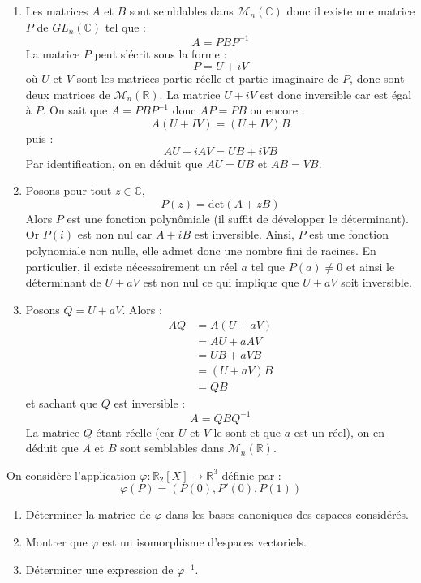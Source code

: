 \documentclass[a4paper,10pt]{report}
\begin{document}
\corr \begin{enumerate}
\item Les matrices $A$ et $B$ sont semblables dans $\mathcal{M}_n(\mathbb{C})$ donc il existe une matrice $P$ de $GL_n(\mathbb{C})$ tel que :
$$ A=PBP^{-1}$$
La matrice $P$ peut s'écrit sous la forme :
$$ P = U+i V$$
où $U$ et $V$ sont les matrices \og partie réelle \fg et \og partie imaginaire \fg de $P$, donc sont deux matrices de $\mathcal{M}_n(\mathbb{R})$. La matrice $U+iV$ est donc inversible car est égal à $P$. On sait que $A=PBP^{-1}$ donc $AP=PB$ ou encore :
$$ A(U+IV) = (U+IV)B$$
puis :
$$ AU+ i AV = UB + i VB$$
Par identification, on en déduit que $AU=UB$ et $AB=VB$.
\item Posons pour tout $z \in \mathbb{C}$,
$$ P(z) = \textrm{det}(A+zB)$$
Alors $P$ est une fonction polynômiale (il suffit de développer le déterminant). Or $P(i)$ est non nul car $A+iB$ est inversible. Ainsi, $P$ est une fonction polynomiale non nulle, elle admet donc une nombre fini de racines. En particulier, il existe nécessairement un réel $a$ tel que $P(a) \neq 0$ et ainsi le déterminant de $U+aV$ est non nul ce qui implique que $U+aV$ soit inversible.
\item Posons $Q=U+aV$. Alors :
\begin{align*}
AQ & = A(U+aV) \\
& = AU + a AV \\
& = UB + a VB \\
& = (U+aV)B \\
& = QB
\end{align*}
et sachant que $Q$ est inversible :
$$ A= QBQ^{-1}$$
La matrice $Q$ étant réelle (car $U$ et $V$ le sont et que $a$ est un réel), on en déduit que $A$ et $B$ sont semblables dans $\mathcal{M}_n(\mathbb{R})$.
\end{enumerate}

\begin{Exa} On considère l'application $\varphi : \mathbb{R}_2[X] \rightarrow \mathbb{R}^3$ définie par :
\[ \varphi(P)=(P(0),P'(0),P(1)) \]

\begin{enumerate}
\item Déterminer la matrice de $\varphi$ dans les bases canoniques des espaces considérés.
\item Montrer que $\varphi$ est un isomorphisme d'espaces vectoriels.
\item Déterminer une expression de $\varphi^{-1}$.
\end{enumerate}
\end{Exa} 
\end{document}
